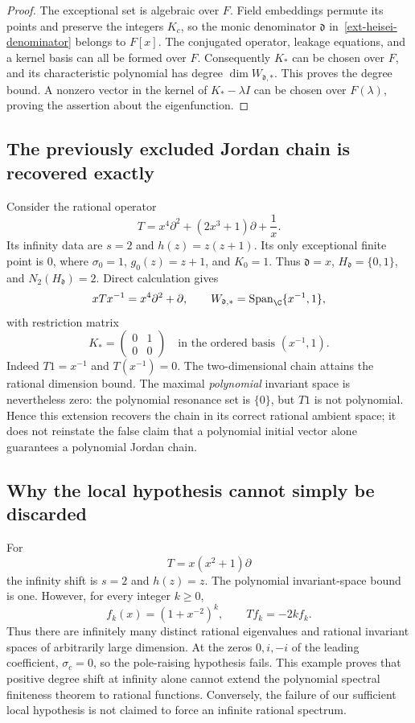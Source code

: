\documentclass[11pt,a4paper]{article}
\theoremstyle{definition}\newtheorem{definition}[theorem]{Definition}
\theoremstyle{remark}\newtheorem{remark}[theorem]{Remark}
\numberwithin{equation}{section}
\begin{document}
\begin{proof}
The exceptional set is algebraic over $F$.  Field embeddings permute its
points and preserve the integers $K_c$, so the monic denominator
$\mathfrak d$ in~\eqref{ext-heisei-denominator} belongs to $F[x]$.
The conjugated operator, leakage equations, and a kernel basis can all be
formed over $F$.  Consequently $K_*$ can be chosen over $F$, and its
characteristic polynomial has degree $\dim W_{\mathfrak d,*}$.  This
proves the degree bound.  A nonzero vector in the kernel of
$K_*-\lambda I$ can be chosen over $F(\lambda)$, proving the assertion
about the eigenfunction.
\end{proof}

\subsection{The previously excluded Jordan chain is recovered exactly}

Consider the rational operator
\begin{equation}
 T=x^4\partial^2+(2x^3+1)\partial+\frac1x.
 \label{ext-heisei-jordan-example}
\end{equation}
Its infinity data are $s=2$ and $h(z)=z(z+1)$.  Its only exceptional finite
point is $0$, where $\sigma_0=1$, $g_0(z)=z+1$, and $K_0=1$.
Thus $\mathfrak d=x$, $H_{\mathfrak d}=\{0,1\}$, and
$N_2(H_{\mathfrak d})=2$.  Direct calculation gives
\[
 xTx^{-1}=x^4\partial^2+\partial,
 \qquad
 W_{\mathfrak d,*}=\operatorname{Span}_{\C}\{x^{-1},1\},
\]
with restriction matrix
\[
 K_*=\begin{pmatrix}0&1\\0&0\end{pmatrix}
 \quad\text{in the ordered basis }(x^{-1},1).
\]
Indeed $T1=x^{-1}$ and $T(x^{-1})=0$.  The two-dimensional chain attains
the rational dimension bound.  The maximal \emph{polynomial} invariant
space is nevertheless zero: the polynomial resonance set is $\{0\}$,
but $T1$ is not polynomial.  Hence this extension recovers the chain in
its correct rational ambient space; it does not reinstate the false claim
that a polynomial initial vector alone guarantees a polynomial Jordan
chain.

\subsection{Why the local hypothesis cannot simply be discarded}

For
\[
 T=x(x^2+1)\partial
\]
the infinity shift is $s=2$ and $h(z)=z$.  The polynomial invariant-space
bound is one.  However, for every integer $k\ge0$,
\[
 f_k(x)=(1+x^{-2})^k,
 \qquad Tf_k=-2k f_k.
\]
Thus there are infinitely many distinct rational eigenvalues and rational
invariant spaces of arbitrarily large dimension.  At the zeros
$0,i,-i$ of the leading coefficient, $\sigma_c=0$, so the pole-raising
hypothesis fails.  This example proves that positive degree shift at
infinity alone cannot extend the polynomial spectral finiteness theorem
to rational functions.  Conversely, the failure of our sufficient local
hypothesis is not claimed to force an infinite rational spectrum.
\end{document}
